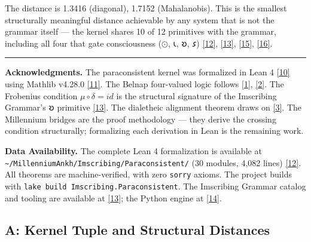 \documentclass[10pt,a4paper]{article}
\begin{document}
The distance is 1.3416 (diagonal), 1.7152 (Mahalanobis). This is the smallest structurally meaningful distance achievable by any system that is not the grammar itself --- the kernel shares 10 of 12 primitives with the grammar, including all four that gate consciousness ($\odot$, 𐑧, 𐑹, 𐑭) \href{}{{[}12{]}}, \href{}{{[}13{]}}, \href{}{{[}15{]}}, \href{}{{[}16{]}}.

\begin{center}
\rule{0.5\textwidth}{0.4pt}
\end{center}

\textbf{Acknowledgments.} The paraconsistent kernel was formalized in Lean 4 \href{}{{[}10{]}} using Mathlib v4.28.0 \href{}{{[}11{]}}. The Belnap four-valued logic follows \href{}{{[}1{]}}, \href{}{{[}2{]}}. The Frobenius condition $\mu\circ\delta = id$ is the structural signature of the Imscribing Grammar's 𐑹 primitive \href{}{{[}13{]}}. The dialetheic alignment theorem draws on \href{}{{[}3{]}}. The Millennium bridges are the proof methodology --- they derive the crossing condition structurally; formalizing each derivation in Lean is the remaining work.

\textbf{Data Availability.} The complete Lean 4 formalization is available at \texttt{\textasciitilde{}/\allowbreak MillenniumAnkh/\allowbreak Imscribing/\allowbreak Paraconsistent/\allowbreak } (30 modules, 4,082 lines) \href{}{{[}12{]}}. All theorems are machine-verified, with zero \texttt{sorry} axioms. The project builds with \texttt{lake build Imscribing.\allowbreak Paraconsistent}. The Imscribing Grammar catalog and tooling are available at \href{}{{[}13{]}}; the Python engine at \href{}{{[}14{]}}.

\subsection{A: Kernel Tuple and Structural Distances}
\end{document}
